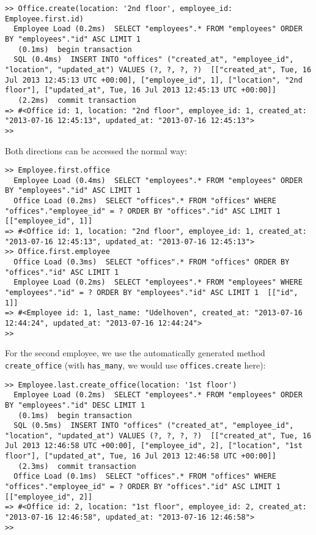 \documentclass[a4paper]{book}
\begin{document}
\begin{shaded}\begin{verbatim}
>> Office.create(location: '2nd floor', employee_id: Employee.first.id)
  Employee Load (0.2ms)  SELECT "employees".* FROM "employees" ORDER BY "employees"."id" ASC LIMIT 1
   (0.1ms)  begin transaction
  SQL (0.4ms)  INSERT INTO "offices" ("created_at", "employee_id", "location", "updated_at") VALUES (?, ?, ?, ?)  [["created_at", Tue, 16 Jul 2013 12:45:13 UTC +00:00], ["employee_id", 1], ["location", "2nd floor"], ["updated_at", Tue, 16 Jul 2013 12:45:13 UTC +00:00]]
   (2.2ms)  commit transaction
=> #<Office id: 1, location: "2nd floor", employee_id: 1, created_at: "2013-07-16 12:45:13", updated_at: "2013-07-16 12:45:13">
>>
\end{verbatim}\end{shaded}

Both directions can be accessed the normal way:

\begin{shaded}\begin{verbatim}
>> Employee.first.office
  Employee Load (0.4ms)  SELECT "employees".* FROM "employees" ORDER BY "employees"."id" ASC LIMIT 1
  Office Load (0.2ms)  SELECT "offices".* FROM "offices" WHERE "offices"."employee_id" = ? ORDER BY "offices"."id" ASC LIMIT 1  [["employee_id", 1]]
=> #<Office id: 1, location: "2nd floor", employee_id: 1, created_at: "2013-07-16 12:45:13", updated_at: "2013-07-16 12:45:13">
>> Office.first.employee
  Office Load (0.3ms)  SELECT "offices".* FROM "offices" ORDER BY "offices"."id" ASC LIMIT 1
  Employee Load (0.2ms)  SELECT "employees".* FROM "employees" WHERE "employees"."id" = ? ORDER BY "employees"."id" ASC LIMIT 1  [["id", 1]]
=> #<Employee id: 1, last_name: "Udelhoven", created_at: "2013-07-16 12:44:24", updated_at: "2013-07-16 12:44:24">
>>
\end{verbatim}\end{shaded}

For the second employee, we use the automatically generated method \texttt{create\_office} (with \texttt{has\_many}, we would use \texttt{offices.create} here):

\begin{shaded}\begin{verbatim}
>> Employee.last.create_office(location: '1st floor')
  Employee Load (0.2ms)  SELECT "employees".* FROM "employees" ORDER BY "employees"."id" DESC LIMIT 1
   (0.1ms)  begin transaction
  SQL (0.5ms)  INSERT INTO "offices" ("created_at", "employee_id", "location", "updated_at") VALUES (?, ?, ?, ?)  [["created_at", Tue, 16 Jul 2013 12:46:58 UTC +00:00], ["employee_id", 2], ["location", "1st floor"], ["updated_at", Tue, 16 Jul 2013 12:46:58 UTC +00:00]]
   (2.3ms)  commit transaction
  Office Load (0.1ms)  SELECT "offices".* FROM "offices" WHERE "offices"."employee_id" = ? ORDER BY "offices"."id" ASC LIMIT 1  [["employee_id", 2]]
=> #<Office id: 2, location: "1st floor", employee_id: 2, created_at: "2013-07-16 12:46:58", updated_at: "2013-07-16 12:46:58">
>>
\end{verbatim}\end{shaded}
\end{document}
